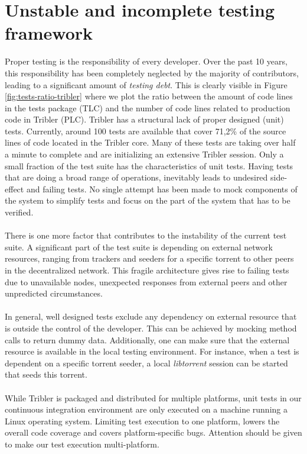 \section{Unstable and incomplete testing framework}
Proper testing is the responsibility of every developer. Over the past 10 years, this responsibility has been completely neglected by the majority of contributors, leading to a significant amount of \emph{testing debt}. This is clearly visible in Figure \ref{fig:tests-ratio-tribler} where we plot the ratio between the amount of code lines in the tests package (TLC) and the number of code lines related to production code in Tribler (PLC). Tribler has a structural lack of proper designed (unit) tests. Currently, around 100 tests are available that cover 71,2\% of the source lines of code located in the Tribler core. Many of these tests are taking over half a minute to complete and are initializing an extensive Tribler session. Only a small fraction of the test suite has the characteristics of unit tests. Having tests that are doing a broad range of operations, inevitably leads to undesired side-effect and failing tests. No single attempt has been made to mock components of the system to simplify tests and focus on the part of the system that has to be verified.\\\\
There is one more factor that contributes to the instability of the current test suite. A significant part of the test suite is depending on external network resources, ranging from trackers and seeders for a specific torrent to other peers in the decentralized network. This fragile architecture gives rise to failing tests due to unavailable nodes, unexpected responses from external peers and other unpredicted circumstances.\\\\
In general, well designed tests exclude any dependency on external resource that is outside the control of the developer. This can be achieved by mocking method calls to return dummy data. Additionally, one can make sure that the external resource is available in the local testing environment. For instance, when a test is dependent on a specific torrent seeder, a local \emph{libtorrent} session can be started that seeds this torrent.\\\\
While Tribler is packaged and distributed for multiple platforms, unit tests in our continuous integration environment are only executed on a machine running a Linux operating system. Limiting test execution to one platform, lowers the overall code coverage and covers platform-specific bugs. Attention should be given to make our test execution multi-platform.

